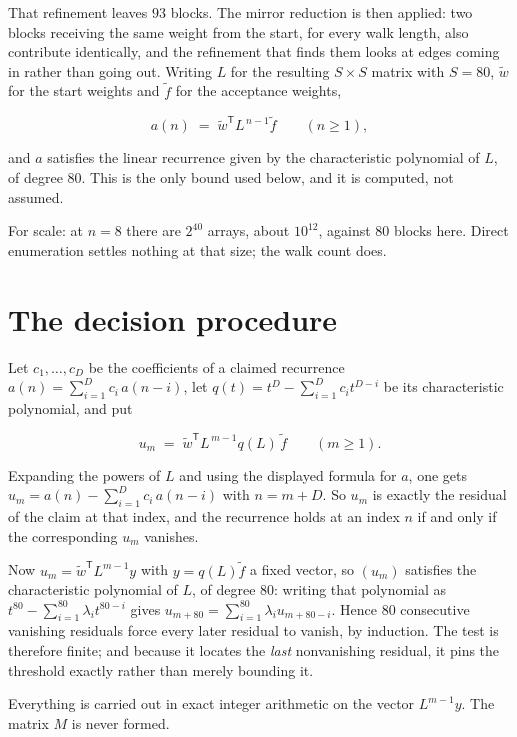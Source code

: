 \documentclass[11pt]{article}
\theoremstyle{definition}
\begin{document}
That refinement leaves $93$ blocks. The mirror reduction is then applied: two blocks receiving the same weight from the start, for every walk length, also contribute identically, and the refinement that finds them looks at edges coming in rather than going out. Writing $L$ for the resulting $S \times S$ matrix with $S = 80$, $\tilde w$ for the start weights and $\tilde f$ for the acceptance weights,

\[a(n) \;=\; \tilde w^{\mathsf T} L^{\,n-1} \tilde f \qquad (n \ge 1),\]

and $a$ satisfies the linear recurrence given by the characteristic polynomial of $L$, of degree $80$. This is the only bound used below, and it is computed, not assumed.

For scale: at $n = 8$ there are $2^{40}$ arrays, about $10^{12}$, against $80$ blocks here. Direct enumeration settles nothing at that size; the walk count does.

\section{The decision procedure}

Let $c_1,\dots,c_D$ be the coefficients of a claimed recurrence $a(n) = \sum_{i=1}^{D} c_i\,a(n-i)$, let $q(t) = t^{D} - \sum_{i=1}^{D} c_i t^{D-i}$ be its characteristic polynomial, and put

\[u_m \;=\; \tilde w^{\mathsf T} L^{\,m-1} q(L)\,\tilde f \qquad (m \ge 1).\]

Expanding the powers of $L$ and using the displayed formula for $a$, one gets $u_m = a(n) - \sum_{i=1}^{D} c_i\,a(n-i)$ with $n = m + D$. So $u_m$ is exactly the residual of the claim at that index, and the recurrence holds at an index $n$ if and only if the corresponding $u_m$ vanishes.

Now $u_m = \tilde w^{\mathsf T} L^{m-1} y$ with $y = q(L)\tilde f$ a fixed vector, so $(u_m)$ satisfies the characteristic polynomial of $L$, of degree $80$: writing that polynomial as $t^{80} - \sum_{i=1}^{80} \lambda_i t^{80-i}$ gives $u_{m+80} = \sum_{i=1}^{80} \lambda_i u_{m+80-i}$. Hence $80$ consecutive vanishing residuals force every later residual to vanish, by induction. The test is therefore finite; and because it locates the {\itshape last} nonvanishing residual, it pins the threshold exactly rather than merely bounding it.

Everything is carried out in exact integer arithmetic on the vector $L^{m-1}y$. The matrix $M$ is never formed.
\end{document}
